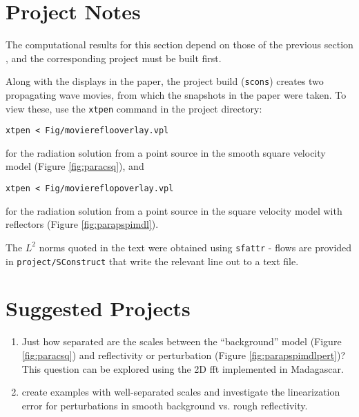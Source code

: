 


\section{Project Notes}
The computational results for this section depend on those of the previous section \cite[]{basic-caam641:17}, and the corresponding project must be built first.

Along with the displays in the paper, the project build ({\tt scons}) creates two propagating wave movies, from which the snapshots in the paper were taken. To view these, use the {\tt xtpen} command in the project directory:
\begin{verbatim}
xtpen < Fig/moviereflooverlay.vpl 
\end{verbatim}
for the radiation solution from a point source in the smooth square velocity model (Figure \ref{fig:paracsq}), and
\begin{verbatim}
xtpen < Fig/moviereflopoverlay.vpl 
\end{verbatim}
for the radiation solution from a point source in the square velocity model with reflectors (Figure \ref{fig:parapspimdl}).

The $L^2$ norms quoted in the text were obtained using {\tt sfattr} - flows are provided in {\tt project/SConstruct} that write the relevant line out to a text file.

\section{Suggested Projects}
\begin{enumerate}
\item Just how separated are the scales between the ``background'' model (Figure \ref{fig:paracsq}) and reflectivity or perturbation (Figure \ref{fig:parapspimdlpert})? This question can be explored using the 2D fft implemented in Madagascar.
\item create examples with well-separated scales and investigate the linearization error for perturbations in smooth background vs. rough reflectivity.
\end{enumerate}


